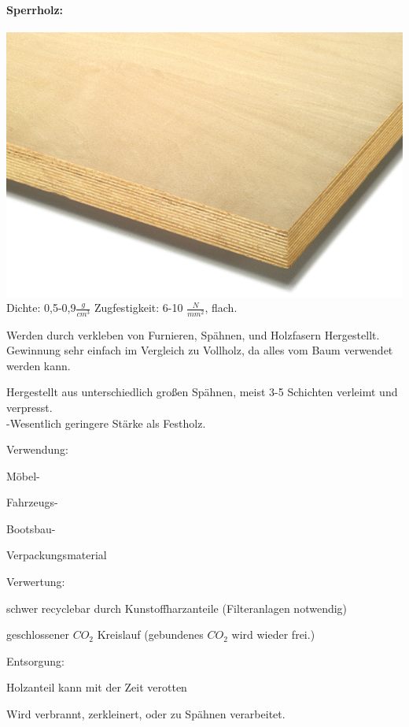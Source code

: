 \documentclass{article}
\begin{document}
\begin{multicols}{3}
  \paragraph{Sperrholz:}
\includegraphics[width=\linewidth]{sperrh.png}
Dichte: 0,5-0,9$\frac{g}{cm^3}$
Zugfestigkeit: 6-10 $\frac{N}{mm^2}$, flach.

Werden durch verkleben von Furnieren, Spähnen, und Holzfasern Hergestellt.\\
Gewinnung sehr einfach im Vergleich zu Vollholz, da alles vom Baum verwendet werden kann.

Hergestellt aus unterschiedlich großen Spähnen, meist 3-5 Schichten verleimt und verpresst.\\
-Wesentlich geringere Stärke als Festholz.

Verwendung:
\begin{compactitem}
  \item Möbel-
  \item Fahrzeugs-
  \item Bootsbau-
  \item Verpackungsmaterial
\end{compactitem}

Verwertung:
\begin{compactitem}
  \item schwer recyclebar durch Kunstoffharzanteile (Filteranlagen notwendig)
  \item geschlossener $CO_2$ Kreislauf (gebundenes $CO_2$ wird wieder frei.)
\end{compactitem}

Entsorgung:
\begin{compactitem}
  \item Holzanteil kann mit der Zeit verotten
  \item Wird verbrannt, zerkleinert, oder zu Spähnen verarbeitet.
\end{compactitem}

\end{multicols}

\end{document}
